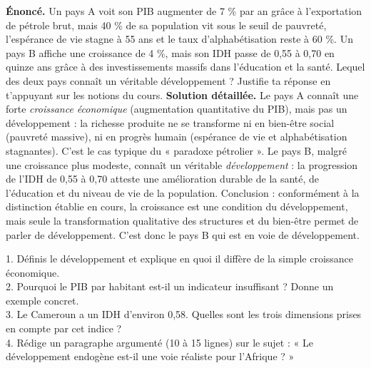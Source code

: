 \documentclass[11pt]{article}
\begin{document}
\begin{exoresolu}
\textbf{Énoncé.} Un pays A voit son PIB augmenter de 7 \% par an grâce à l'exportation de pétrole brut, mais 40 \% de sa population vit sous le seuil de pauvreté, l'espérance de vie stagne à 55 ans et le taux d'alphabétisation reste à 60 \%. Un pays B affiche une croissance de 4 \%, mais son IDH passe de 0,55 à 0,70 en quinze ans grâce à des investissements massifs dans l'éducation et la santé. Lequel des deux pays connaît un véritable développement ? Justifie ta réponse en t'appuyant sur les notions du cours.
\tcblower
\textbf{Solution détaillée.} Le pays A connaît une forte \emph{croissance économique} (augmentation quantitative du PIB), mais pas un développement : la richesse produite ne se transforme ni en bien-être social (pauvreté massive), ni en progrès humain (espérance de vie et alphabétisation stagnantes). C'est le cas typique du « paradoxe pétrolier ». Le pays B, malgré une croissance plus modeste, connaît un véritable \emph{développement} : la progression de l'IDH de 0,55 à 0,70 atteste une amélioration durable de la santé, de l'éducation et du niveau de vie de la population. Conclusion : conformément à la distinction établie en cours, la croissance est une condition du développement, mais seule la transformation qualitative des structures et du bien-être permet de parler de développement. C'est donc le pays B qui est en voie de développement.
\end{exoresolu}

\begin{exercice}
1. Définis le développement et explique en quoi il diffère de la simple croissance économique.\\
2. Pourquoi le PIB par habitant est-il un indicateur insuffisant ? Donne un exemple concret.\\
3. Le Cameroun a un IDH d'environ 0,58. Quelles sont les trois dimensions prises en compte par cet indice ?\\
4. Rédige un paragraphe argumenté (10 à 15 lignes) sur le sujet : « Le développement endogène est-il une voie réaliste pour l'Afrique ? »
\end{exercice}
\end{document}
